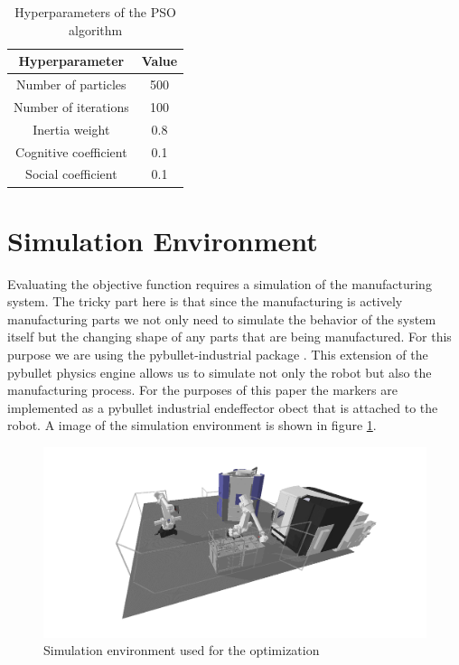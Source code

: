 \documentclass{svproc}
\begin{document}
\begin{table}  %
        \centering
        \begin{tabular}{c|c}
                Hyperparameter & Value \\
                \hline
                Number of particles & 500 \\
                Number of iterations & 100 \\
                Inertia weight & 0.8 \\
                Cognitive coefficient & 0.1 \\
                Social coefficient & 0.1 \\
        \end{tabular}
        \caption{Hyperparameters of the PSO algorithm}
        \label{tab:hyperparameters}
\end{table}

\section{Simulation Environment}
Evaluating the objective function requires a simulation of the manufacturing system.
The tricky part here is that since the manufacturing is actively manufacturing parts we not only need to simulate the behavior of the system itself but the changing shape of any parts that are being manufactured.
For this purpose we are using the pybullet-industrial package \cite{pybullet_industrial}.
This extension of the pybullet physics engine allows us to simulate not only the robot but also the manufacturing process.
For the purposes of this paper the markers are implemented as a pybullet industrial endeffector obect that is attached to the robot.
A image of the simulation environment is shown in figure \ref{fig:simulation}.
\begin{figure}
        \centering
        \includegraphics[width=\textwidth]{figures/simulation.png}
        \caption{Simulation environment used for the optimization}
        \label{fig:simulation}
\end{figure}
\end{document}
